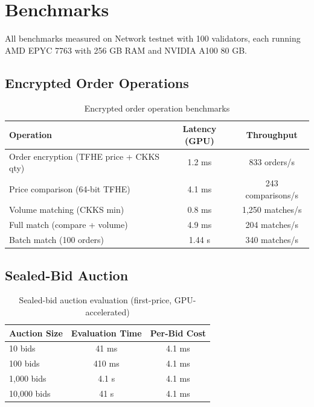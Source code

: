 \section{Benchmarks}

\label{sec:benchmarks}

All benchmarks measured on \Zoo{} Network testnet with 100 validators, each running AMD EPYC 7763 with 256 GB RAM and NVIDIA A100 80 GB.

\subsection{Encrypted Order Operations}

\begin{table}[h]
\centering
\begin{tabular}{lcc}
\toprule
\textbf{Operation} & \textbf{Latency (GPU)} & \textbf{Throughput} \\
\midrule
Order encryption (TFHE price + CKKS qty) & 1.2 ms & 833 orders/s \\
Price comparison (64-bit TFHE) & 4.1 ms & 243 comparisons/s \\
Volume matching (CKKS min) & 0.8 ms & 1,250 matches/s \\
Full match (compare + volume) & 4.9 ms & 204 matches/s \\
Batch match (100 orders) & 1.44 s & 340 matches/s \\
\bottomrule
\end{tabular}
\caption{Encrypted order operation benchmarks}
\label{tab:order_bench}
\end{table}

\subsection{Sealed-Bid Auction}

\begin{table}[h]
\centering
\begin{tabular}{lcc}
\toprule
\textbf{Auction Size} & \textbf{Evaluation Time} & \textbf{Per-Bid Cost} \\
\midrule
10 bids & 41 ms & 4.1 ms \\
100 bids & 410 ms & 4.1 ms \\
1,000 bids & 4.1 s & 4.1 ms \\
10,000 bids & 41 s & 4.1 ms \\
\bottomrule
\end{tabular}
\caption{Sealed-bid auction evaluation (first-price, GPU-accelerated)}
\label{tab:auction_bench}
\end{table}

